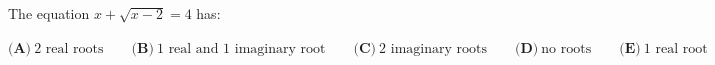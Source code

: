 The equation $x+\sqrt{x-2}=4$ has:

$\textbf{(A)}\ 2\text{ real roots}\qquad\textbf{(B)}\ 1\text{ real and }1\text{ imaginary root}\qquad\textbf{(C)}\ 2\text{ imaginary roots}\qquad\textbf{(D)}\ \text{no roots}\qquad\textbf{(E)}\ 1\text{ real root}$
